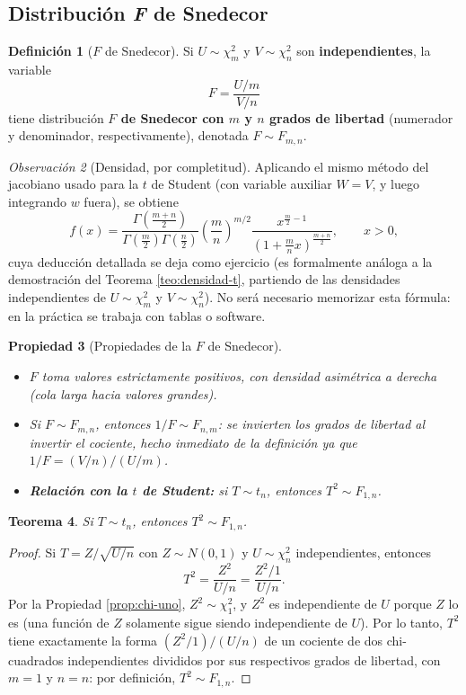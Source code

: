 \documentclass[11pt,a4paper]{article}
\theoremstyle{plain}
\newtheorem{teorema}{Teorema}[section]
\newtheorem{propiedad}[teorema]{Propiedad}
\theoremstyle{definition}
\newtheorem{definicion}[teorema]{Definición}
\theoremstyle{remark}
\newtheorem{observacion}[teorema]{Observación}
\begin{document}
\subsection{Distribución \emph{F} de Snedecor}

\begin{definicion}[$F$ de Snedecor]
Si $U\sim\chi_m^2$ y $V\sim\chi_n^2$ son \textbf{independientes}, la variable
\[
F = \frac{U/m}{V/n}
\]
tiene distribución \textbf{$F$ de Snedecor con $m$ y $n$ grados de libertad} (numerador y denominador, respectivamente), denotada $F\sim F_{m,n}$.
\end{definicion}

\begin{observacion}[Densidad, por completitud]
Aplicando el mismo método del jacobiano usado para la $t$ de Student (con variable auxiliar $W=V$, y luego integrando $w$ fuera), se obtiene
\[
f(x) = \frac{\Gamma\!\left(\frac{m+n}{2}\right)}{\Gamma\!\left(\frac m2\right)\Gamma\!\left(\frac n2\right)}\left(\frac mn\right)^{m/2} \frac{x^{\frac m2-1}}{\left(1+\frac mn x\right)^{\frac{m+n}{2}}}, \qquad x>0,
\]
cuya deducción detallada se deja como ejercicio (es formalmente análoga a la demostración del Teorema \ref{teo:densidad-t}, partiendo de las densidades independientes de $U\sim\chi_m^2$ y $V\sim\chi_n^2$). No será necesario memorizar esta fórmula: en la práctica se trabaja con tablas o software.
\end{observacion}

\begin{propiedad}[Propiedades de la $F$ de Snedecor]
\begin{itemize}
\item $F$ toma valores estrictamente positivos, con densidad asimétrica a derecha (cola larga hacia valores grandes).
\item Si $F\sim F_{m,n}$, entonces $1/F\sim F_{n,m}$: se invierten los grados de libertad al invertir el cociente, hecho inmediato de la definición ya que $1/F=(V/n)/(U/m)$.
\item \textbf{Relación con la $t$ de Student:} si $T\sim t_n$, entonces $T^2\sim F_{1,n}$.
\end{itemize}
\end{propiedad}

\begin{teorema}
Si $T\sim t_n$, entonces $T^2\sim F_{1,n}$.
\end{teorema}

\begin{proof}
Si $T=Z/\sqrt{U/n}$ con $Z\sim N(0,1)$ y $U\sim\chi_n^2$ independientes, entonces
\[
T^2 = \frac{Z^2}{U/n} = \frac{Z^2/1}{U/n}.
\]
Por la Propiedad \ref{prop:chi-uno}, $Z^2\sim\chi_1^2$, y $Z^2$ es independiente de $U$ porque $Z$ lo es (una función de $Z$ solamente sigue siendo independiente de $U$). Por lo tanto, $T^2$ tiene exactamente la forma $(Z^2/1)/(U/n)$ de un cociente de dos chi-cuadrados independientes divididos por sus respectivos grados de libertad, con $m=1$ y $n=n$: por definición, $T^2\sim F_{1,n}$.
\end{proof}
\end{document}
